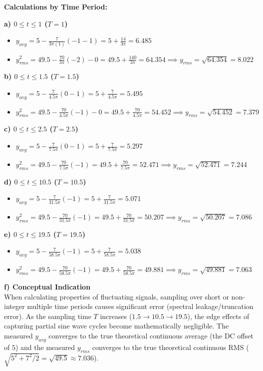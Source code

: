 \documentclass[11pt]{article}
\begin{document}
\textbf{Calculations by Time Period:}

\textbf{a) $0 \le t \le 1$ ($T = 1$)}
\begin{itemize}
\item $y_{avg} = 5 - \frac{7}{3\pi(1)} (-1 - 1) = 5 + \frac{14}{3\pi} = \mathbf{6.485}$
\item $y_{rms}^2 = 49.5 - \frac{70}{3\pi} (-2) - 0 = 49.5 + \frac{140}{3\pi} = 64.354 \implies y_{rms} = \sqrt{64.354} = \mathbf{8.022}$
\end{itemize}

\textbf{b) $0 \le t \le 1.5$ ($T = 1.5$)}
\begin{itemize}
\item $y_{avg} = 5 - \frac{7}{4.5\pi} (0 - 1) = 5 + \frac{7}{4.5\pi} = \mathbf{5.495}$
\item $y_{rms}^2 = 49.5 - \frac{70}{4.5\pi} (-1) - 0 = 49.5 + \frac{70}{4.5\pi} = 54.452 \implies y_{rms} = \sqrt{54.452} = \mathbf{7.379}$
\end{itemize}

\textbf{c) $0 \le t \le 2.5$ ($T = 2.5$)}
\begin{itemize}
\item $y_{avg} = 5 - \frac{7}{7.5\pi} (0 - 1) = 5 + \frac{7}{7.5\pi} = \mathbf{5.297}$
\item $y_{rms}^2 = 49.5 - \frac{70}{7.5\pi} (-1) = 49.5 + \frac{70}{7.5\pi} = 52.471 \implies y_{rms} = \sqrt{52.471} = \mathbf{7.244}$
\end{itemize}

\textbf{d) $0 \le t \le 10.5$ ($T = 10.5$)}
\begin{itemize}
\item $y_{avg} = 5 - \frac{7}{31.5\pi} (-1) = 5 + \frac{7}{31.5\pi} = \mathbf{5.071}$
\item $y_{rms}^2 = 49.5 - \frac{70}{31.5\pi} (-1) = 49.5 + \frac{70}{31.5\pi} = 50.207 \implies y_{rms} = \sqrt{50.207} = \mathbf{7.086}$
\end{itemize}

\textbf{e) $0 \le t \le 19.5$ ($T = 19.5$)}
\begin{itemize}
\item $y_{avg} = 5 - \frac{7}{58.5\pi} (-1) = 5 + \frac{7}{58.5\pi} = \mathbf{5.038}$
\item $y_{rms}^2 = 49.5 - \frac{70}{58.5\pi} (-1) = 49.5 + \frac{70}{58.5\pi} = 49.881 \implies y_{rms} = \sqrt{49.881} = \mathbf{7.063}$
\end{itemize}

\textbf{f) Conceptual Indication} \\
When calculating properties of fluctuating signals, sampling over short or non-integer multiple time periods causes significant error (spectral leakage/truncation error). As the sampling time $T$ increases ($1.5 \to 10.5 \to 19.5$), the edge effects of capturing partial sine wave cycles become mathematically negligible. The measured $y_{avg}$ converges to the true theoretical continuous average (the DC offset of $5$) and the measured $y_{rms}$ converges to the true theoretical continuous RMS ($\sqrt{5^2 + 7^2/2} = \sqrt{49.5} \approx 7.036$).
\end{document}
